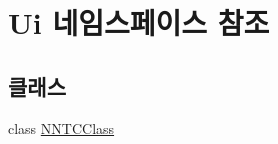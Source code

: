 \hypertarget{namespace_ui}{}\section{Ui 네임스페이스 참조}
\label{namespace_ui}
\subsection*{클래스}
\begin{DoxyCompactItemize}
\item 
class \mbox{\hyperlink{class_ui_1_1_n_n_t_c_class}{N\+N\+T\+C\+Class}}
\end{DoxyCompactItemize}
